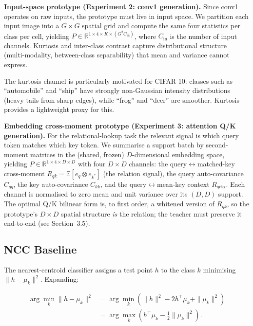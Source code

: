 \documentclass{article}
\begin{document}
\textbf{Input-space prototype (Experiment 2: conv1 generation).} Since conv1 operates on raw inputs, the prototype must live in input space. We partition each input image into a $G\times G$ spatial grid and compute the same four statistics per class per cell, yielding $P \in \mathbb{R}^{1\times4\times K\times(G^2 C_{\mathrm{in}})}$, where $C_{\mathrm{in}}$ is the number of input channels. Kurtosis and inter-class contrast capture distributional structure (multi-modality, between-class separability) that mean and variance cannot express.

The kurtosis channel is particularly motivated for CIFAR-10: classes such as ``automobile'' and ``ship'' have strongly non-Gaussian intensity distributions (heavy tails from sharp edges), while ``frog'' and ``deer'' are smoother. Kurtosis provides a lightweight proxy for this.

\textbf{Embedding cross-moment prototype (Experiment 3: attention Q/K generation).} For the relational-lookup task the relevant signal is which query token matches which key token. We summarise a support batch by second-moment matrices in the (shared, frozen) $D$-dimensional embedding space, yielding $P \in \mathbb{R}^{1\times4\times D\times D}$ with four $D\times D$ channels: the query$\leftrightarrow$matched-key cross-moment $R_{qk}=\mathbb{E}[e_q\otimes e_{k^\ast}]$ (the relation signal), the query auto-covariance $C_{qq}$, the key auto-covariance $C_{kk}$, and the query$\leftrightarrow$mean-key context $R_{q\mathrm{ctx}}$. Each channel is normalised to zero mean and unit variance over its $(D,D)$ support. The optimal Q/K bilinear form is, to first order, a whitened version of $R_{qk}$, so the prototype's $D\times D$ spatial structure \emph{is} the relation; the teacher must preserve it end-to-end (see Section~3.5).

\subsection{NCC Baseline}\label{ncc-baseline}

The nearest-centroid classifier assigns a test point $h$ to the class $k$ minimising $\|h-\mu_k\|^2$. Expanding:

\begin{align}
\arg\min_k \|h-\mu_k\|^2
&= \arg\min_k \left(\|h\|^2 - 2h^\top\mu_k + \|\mu_k\|^2\right) \\
&= \arg\max_k \left(h^\top\mu_k - \frac{1}{2}\|\mu_k\|^2\right).
\end{align}
\end{document}
